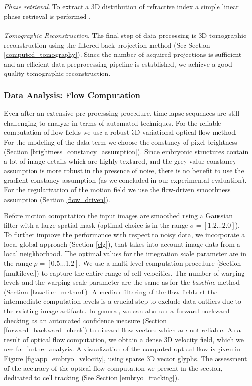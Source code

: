 \\
\\
\textit{Phase retrieval}. To extract a 3D distribution of refractive index a simple linear phase retrieval is performed \cite{Paganin98}.
\\
\\
\textit{Tomographic Reconstruction}. The final step of data processing is 3D  tomographic reconstruction using the filtered back-projection method (See Section \ref{computed_tomography}). Since the number of acquired projections is sufficient and an efficient data preprocessing pipeline is established, we achieve a good quality tomographic reconstruction. 


\subsubsection{Data Analysis: Flow Computation}

Even after an extensive pre-processing procedure, time-lapse sequences are still challenging to analyze in terms of automated techniques. For the reliable computation of flow fields we use a robust 3D variational optical flow method. For the modeling of the data term we choose the constancy of pixel brightness (Section \ref{brightness_constancy_assumption}). Since embryonic structures contain a lot of image details which are highly textured, and the grey value constancy assumption is more robust in the presence of noise, there is no benefit to use the gradient constancy assumption (as we concluded in our experimental evaluation). For the regularization of the motion field we use the flow-driven smoothness assumption (Section \ref{flow_driven}). 

Before motion computation the input images are smoothed using a Gaussian filter with a large spatial mask (optimal choice is in the range $\sigma=[1.2 \ldots 2.0]$).
To further improve the performance with respect to noisy data, we incorporate a local-global approach (Section \ref{clg}), that takes into account image data from a local neighborhood. The optimal values for the integration scale parameter are in the range $\rho = [0.5 \ldots 1.2]$. We use a multi-level
computation procedure (Section \ref{multilevel}) to capture the entire range of cell velocities. The number of warping levels and the warping scale parameter are the same as for the \textit{baseline} method (Section \ref{baseline_method}).  A median filtering of the flow fields at the intermediate computation levels is a crucial step to exclude data outliers due to the existing image artifacts. In general, we can also use a forward-backward checking as an automated confidence measure (Section  \ref{forward_backward_check}) to discard flow vectors which are not reliable. As a result of optical flow computation, we obtain a dense 3D velocity field, which we use for further analysis.  A visualization of the computed optical flow is given in Figure \ref{fig:app_embryo_velocity}, using sparse 3D vector glyphs. The assessment of the accuracy of the optical flow computation we present in the section, dedicated to cell tracking (See Section \ref{embryo_tracking}).

